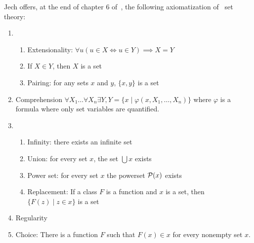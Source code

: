 \begin{node}
  Jech offers, at the end of chapter 6 of~\cite{jech2003set},
  the following axiomatization of \NBG\ set theory:
  \begin{enumerate}
  \item \begin{enumerate}
  \item Extensionality: $\forall u(u\in X\iff u\in Y)\implies X=Y$
  \item If $X\in Y$, then $X$ is a set
  \item Pairing: for any sets $x$ and $y$, $\{x,y\}$ is a set
  \end{enumerate}
  \item Comprehension $\forall X_{1}\dots\forall X_{n}\exists Y, Y=\{x\mid\varphi(x,X_{1},\dots,X_{n})\}$
    where $\varphi$ is a formula where only set variables are quantified.
  \item \begin{enumerate}
  \item Infinity: there exists an infinite set
  \item Union: for every set $x$, the set $\bigcup x$ exists
  \item Power set: for every set $x$ the powerset $\mathcal{P}(x)$ exists
  \item Replacement: If a class $F$ is a function and $x$ is a set, then
    $\{F(z)\mid z\in x\}$ is a set
  \end{enumerate}
  \item Regularity
  \item Choice: There is a function $F$ such that $F(x)\in x$ for every
    nonempty set $x$.
  \end{enumerate}
\end{node}
